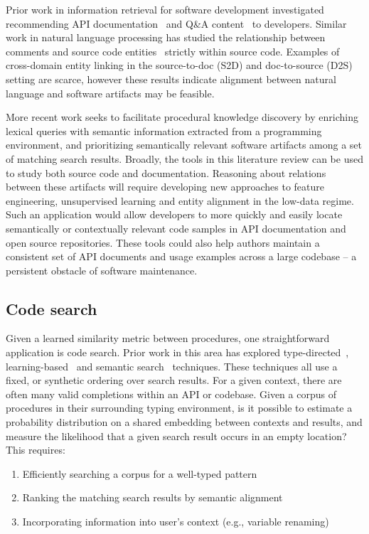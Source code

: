 \documentclass[12pt]{article}
\begin{document}
Prior work in information retrieval for software development investigated recommending API documentation~\cite{robillard2015recommending} and Q\&A content~\cite{treude2016augmenting} to developers. Similar work in natural language processing has studied the relationship between comments and source code entities~\cite{iyer2018mapping, panthaplackel2020associating} strictly within source code. Examples of cross-domain entity linking in the source-to-doc (S2D) and doc-to-source (D2S) setting are scarce, however these results indicate alignment between natural language and software artifacts may be feasible.

More recent work seeks to facilitate procedural knowledge discovery by enriching lexical queries with semantic information extracted from a programming environment, and prioritizing semantically relevant software artifacts among a set of matching search results. Broadly, the tools in this literature review can be used to study both source code and documentation. Reasoning about relations between these artifacts will require developing new approaches to feature engineering, unsupervised learning and entity alignment in the low-data regime. Such an application would allow developers to more quickly and easily locate semantically or contextually relevant code samples in API documentation and open source repositories. These tools could also help authors maintain a consistent set of API documents and usage examples across a large codebase -- a persistent obstacle of software maintenance.

\subsection{Code search}\label{subsec:code-search}

Given a learned similarity metric between procedures, one straightforward application is code search. Prior work in this area has explored type-directed~\cite{james2020digging}, learning-based~\cite{gu2018deep} and semantic search~\cite{premtoon2020semantic} techniques. These techniques all use a fixed, or synthetic ordering over search results. For a given context, there are often many valid completions within an API or codebase. Given a corpus of procedures in their surrounding typing environment, is it possible to estimate a probability distribution on a shared embedding between contexts and results, and measure the likelihood that a given search result occurs in an empty location? This requires:

  \begin{enumerate}
    \item Efficiently searching a corpus for a well-typed pattern
    \item Ranking the matching search results by semantic alignment
    \item Incorporating information into user's context (e.g., variable renaming)
  \end{enumerate}
\end{document}
